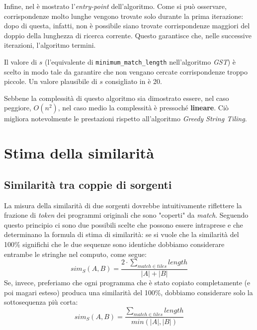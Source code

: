 

Infine, nel  è mostrato l'\textit{entry-point} dell'algoritmo.
%
Come si può osservare, corrispondenze molto lunghe vengono trovate solo durante la prima iterazione: dopo di questa, infatti, non è possibile siano trovate corrispondenze maggiori del doppio della lunghezza di ricerca corrente.
%
Questo garantisce che, nelle successive iterazioni, l'algoritmo termini.



Il valore di $s$ (l'equivalente di \texttt{minimum\_match\_length} nell'algoritmo \textit{GST}) è scelto in modo tale da garantire che non vengano cercate corrispondenze troppo piccole.
%
Un valore plausibile di $s$ consigliato in \cite{wise-running-93} è 20.

Sebbene la complessità di questo algoritmo sia dimostrato essere, nel caso peggiore, $O(n^2)$, nel caso medio la complessità è pressoché \textbf{lineare}.
%
Ciò migliora notevolmente le prestazioni rispetto all'algoritmo \textit{Greedy String Tiling}.

\section{Stima della similarità}

\subsection*{Similarità tra coppie di sorgenti}
La misura della similarità di due sorgenti dovrebbe intuitivamente riflettere la frazione di \textit{token} dei programmi originali che sono "coperti" da \textit{match}.
%
Seguendo questo principio ci sono due possibili scelte che possono essere intraprese e che determinano la formula di stima di similarità: se si vuole che la similarità del 100\% significhi che le due sequenze sono identiche dobbiamo considerare entrambe le stringhe nel computo, come segue:
%
\begin{equation}
\label{eq:avg-norm-sim}
	sim_S(A, B) = \frac{2 \cdot \sum_{match \in tiles} length}{|A|+|B|}
\end{equation}
%
Se, invece, preferiamo che ogni programma che è stato copiato completamente (e poi magari esteso) produca una similarità del 100\%, dobbiamo considerare solo la sottosequenza più corta:
%
\begin{equation}
\label{eq:max-norm-sim}
	sim_S(A, B) = \frac{\sum_{match \in tiles} length}{min(|A|, |B|)}
\end{equation} 

